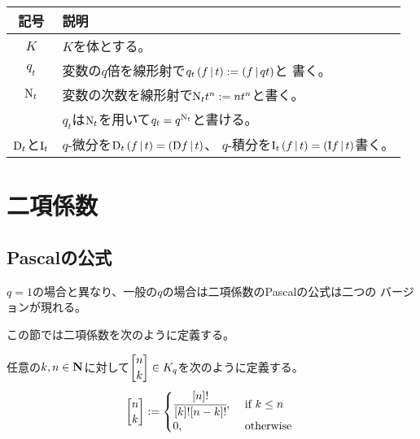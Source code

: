 \begingroup %
\newcommand{\q}[1]{{\blr{#1}}}
\newcommand{\qg}[1]{{\blrg{#1}}}
\newcommand{\qgg}[1]{{\blrgg{#1}}}
\newcommand{\qggg}[1]{{\blrggg{#1}}}
\newcommand{\qgggg}[1]{{\blrgggg{#1}}}
\newcommand{\qa}[1]{{\blra{#1}}}
\newcommand{\bou}{{\,|\,}}
\newcommand{\opN}{{\op{N}}}
\newcommand{\qD}{{\op{D}}}
\newcommand{\qI}{{\op{I}}}
{\setlength\arraycolsep{2pt}
%
	\begin{table}[htbp] %
		\begin{center}\begin{tabular}{cl}
			記号 & 説明 \\\hline
			$K$ & $K$を体とする。\\
			$q_t$ & 変数の$q$倍を線形射で$q_t\plr{f\bou t}:=\plr{f\bou qt}$と
			書く。 \\
			$\opN_t$ & 変数の次数を線形射で$\opN_tt^n:=nt^n$と書く。\\
			& $q_t$は$\opN_t$を用いて$q_t=q^{\opN_t}$と書ける。\\
			$\qD_t$と$\qI_t$ & $q$-微分を$\qD_t\plr{f\bou t}=\plr{\qD f\bou t}$、
			$q$-積分を$\qI_t\plr{f\bou t}=\plr{\qI f\bou t}$書く。
		\end{tabular}\end{center}
	\end{table} %

\section{二項係数}\label{s1:二項係数} %
\subsection{Pascalの公式}\label{s2:Pascalの公式} %
	$q=1$の場合と異なり、一般の$q$の場合は二項係数のPascalの公式は二つの
	バージョンが現れる。

	この節では二項係数を次のように定義する。

	\begin{definition}[二項係数]\label{def:二項係数} %
		任意の$k,n\in\mathbf{N}$に対して$\qbinom{n}{k}\in K_q$を次のように定義する。
		\begin{equation*}\begin{split}
			\qbinom{n}{k} := \begin{cases}
				\cfrac{\q{n}!}{\q{k}!\q{n-k}!}, &\text{ if } k\le n \\
				0, &\text{ otherwise } \\
			\end{cases}
		\end{split}\end{equation*}
	\end{definition} %

}
